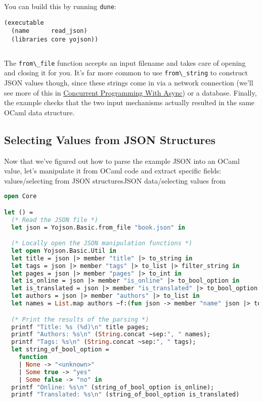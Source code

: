 You can build this by running \passthrough{\lstinline!dune!}:

\begin{lstlisting}
(executable
  (name      read_json)
  (libraries core yojson))
\end{lstlisting}

\begin{lstlisting}[language=bash]
\end{lstlisting}

The \passthrough{\lstinline!from\_file!} function accepts an input
filename and takes care of opening and closing it for you. It's far more
common to use \passthrough{\lstinline!from\_string!} to construct JSON
values though, since these strings come in via a network connection
(we'll see more of this in
\href{concurrent-programming.html\#concurrent-programming-with-async}{Concurrent
Programming With Async}) or a database. Finally, the example checks that
the two input mechanisms actually resulted in the same OCaml data
structure.

\hypertarget{selecting-values-from-json-structures}{%
\subsection{Selecting Values from JSON
Structures}\label{selecting-values-from-json-structures}}

Now that we've figured out how to parse the example JSON into an OCaml
value, let's manipulate it from OCaml code and extract specific fields:
\protect\hypertarget{VALjson}{}{values/selecting from JSON
structures}\protect\hypertarget{JSONselval}{}{JSON data/selecting values
from}

\begin{lstlisting}[language=Caml]
open Core

let () =
  (* Read the JSON file *)
  let json = Yojson.Basic.from_file "book.json" in

  (* Locally open the JSON manipulation functions *)
  let open Yojson.Basic.Util in
  let title = json |> member "title" |> to_string in
  let tags = json |> member "tags" |> to_list |> filter_string in
  let pages = json |> member "pages" |> to_int in
  let is_online = json |> member "is_online" |> to_bool_option in
  let is_translated = json |> member "is_translated" |> to_bool_option in
  let authors = json |> member "authors" |> to_list in
  let names = List.map authors ~f:(fun json -> member "name" json |> to_string) in

  (* Print the results of the parsing *)
  printf "Title: %s (%d)\n" title pages;
  printf "Authors: %s\n" (String.concat ~sep:", " names);
  printf "Tags: %s\n" (String.concat ~sep:", " tags);
  let string_of_bool_option =
    function
    | None -> "<unknown>"
    | Some true -> "yes"
    | Some false -> "no" in
  printf "Online: %s\n" (string_of_bool_option is_online);
  printf "Translated: %s\n" (string_of_bool_option is_translated)
\end{lstlisting}

